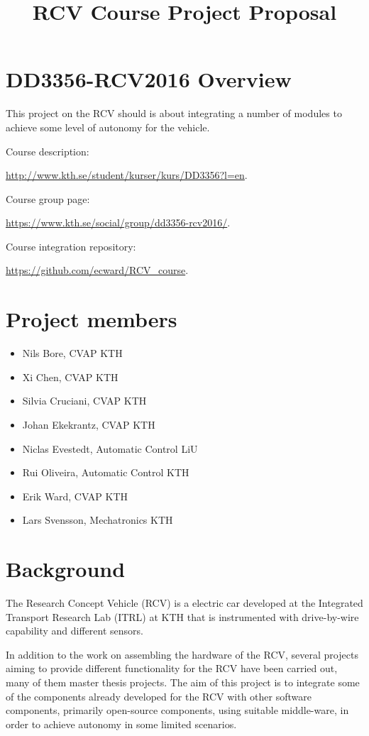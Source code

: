 \documentclass[11pt,a4paper]{article}
\title{RCV Course Project Proposal}
\begin{document}
\maketitle

\section{DD3356-RCV2016 Overview}

This project on the RCV should is about integrating a number of modules to achieve some level of autonomy for the vehicle.

Course description:

\url{http://www.kth.se/student/kurser/kurs/DD3356?l=en}.

Course group page:

\url{https://www.kth.se/social/group/dd3356-rcv2016/}.

Course integration repository:

\url{https://github.com/ecward/RCV_course}.

\section{Project members}

\begin{itemize}
\item Nils Bore, CVAP KTH
\item Xi Chen, CVAP KTH
\item Silvia Cruciani, CVAP KTH
\item Johan Ekekrantz, CVAP KTH
\item Niclas Evestedt, Automatic Control LiU
\item Rui Oliveira, Automatic Control KTH
\item Erik Ward, CVAP KTH
\item Lars Svensson, Mechatronics KTH
\end{itemize}

\section{Background}

The Research Concept Vehicle (RCV) is a electric car developed at the
Integrated Transport Research Lab (ITRL) at KTH that is instrumented
with drive-by-wire capability and different sensors.

In addition to the work on assembling the hardware of the RCV, several
projects aiming to provide different functionality for the RCV have
been carried out, many of them master thesis projects. The aim of this
project is to integrate some of the components already developed for
the RCV with other software components, primarily open-source
components, using suitable middle-ware, in order to achieve
autonomy in some limited scenarios.
\end{document}
